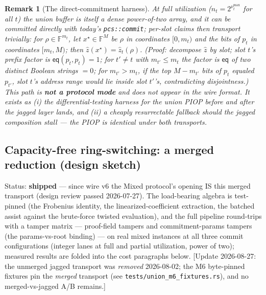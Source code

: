 \documentclass[11pt]{article}
\newcommand{\F}{\mathbb{F}}                       %
\newcommand{\eq}{\mathsf{eq}}
\newcommand{\code}[1]{\texttt{#1}}
\newtheorem{remark}{Remark}
\theoremstyle{definition}
\begin{document}
\begin{remark}[The direct-commitment harness]\label{rem:harness}
At full utilization ($n_t = 2^{\nu_t^{\max}}$ for all $t$) the union buffer
is itself a dense power-of-two array, and it can be committed directly with
today's \code{pcs::commit}; per-slot claims then transport \emph{trivially}:
for $\rho \in \F^{m_t}$, let $x^\star \in \F^{M}$ be $\rho$ in coordinates
$[0, m_t)$ and the bits of $p_t$ in coordinates $[m_t, M)$; then
$\hat z(x^\star) = \hat z_t(\rho)$. (Proof: decompose $\hat z$ by slot; slot
$t$'s prefix factor is $\eq(p_t, p_t) = 1$; for $t' \ne t$ with
$m_{t'} \le m_t$ the factor is $\eq$ of two distinct Boolean strings $= 0$;
for $m_{t'} > m_t$, if the top $M - m_{t'}$ bits of $p_t$ equaled $p_{t'}$,
slot $t$'s address range would lie inside slot $t'$'s, contradicting
disjointness.) This path is \textbf{not a protocol mode} and does not
appear in the wire format. It exists as (i) the differential-testing
harness for the union PIOP before and after the jagged layer lands, and
(ii) a cheaply resurrectable fallback should the jagged composition stall
--- the PIOP is identical under both transports.
\end{remark}

\subsection{Capacity-free ring-switching: a merged reduction (design
sketch)}\label{sec:merged}

Status: \textbf{shipped} --- since wire v6 the Mixed protocol's opening
IS this merged transport (design review passed 2026-07-27). The
load-bearing algebra is test-pinned (the Frobenius identity, the
linearized-coefficient extraction, the batched assist against the
brute-force twisted evaluation), and the full pipeline round-trips with
a tamper matrix --- proof-field tampers and commitment-params tampers
(the params-vs-root binding) --- on real mixed instances at all three
commit configurations (integer lanes at full and partial utilization,
power of two); measured results are folded into the cost paragraphs
below. [Update 2026-08-27: the unmerged jagged transport was \emph{removed}
2026-08-02; the M6 byte-pinned fixtures pin the \emph{merged} transport
(see \code{tests/union\_m6\_fixtures.rs}), and no merged-vs-jagged A/B
remains.]
\end{document}
